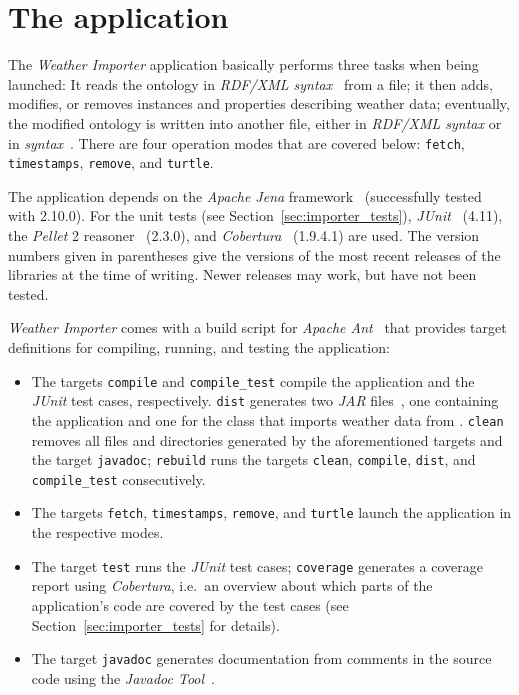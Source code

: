 \section{The application}
\label{sec:importer_application}

The \emph{Weather Importer} application basically performs three tasks when being launched: It reads the \smarthomeweather ontology in \emph{RDF/XML syntax}~\cite{RDF_XML} from a file; it then adds, modifies, or removes instances and properties describing weather data; eventually, the modified ontology is written into another file, either in \emph{RDF/XML syntax} or in \emph{ syntax}~\cite{Turtle}. There are four operation modes that are covered below: \texttt{fetch}, \texttt{timestamps}, \texttt{remove}, and \texttt{turtle}.

The application depends on the \emph{Apache Jena} framework~\cite{apache_jena} (successfully tested with 2.10.0). For the unit tests (see Section~\ref{sec:importer_tests}), \emph{JUnit}~\cite{junit} (4.11), the \emph{Pellet}  2 reasoner~\cite{pellet} (2.3.0), and \emph{Cobertura}~\cite{cobertura} (1.9.4.1) are used. The version numbers given in parentheses give the versions of the most recent releases of the libraries at the time of writing. Newer releases may work, but have not been tested.

\emph{Weather Importer} comes with a build script for \emph{Apache Ant}~\cite{apache_ant} that provides target definitions for compiling, running, and testing the application:

\begin{itemize}
  \item The targets \texttt{compile} and \texttt{compile\_test} compile the application and the \emph{JUnit} test cases, respectively. \texttt{dist} generates two \emph{JAR} files~\cite{jar}, one containing the application and one for the class that imports weather data from \yrno. \texttt{clean} removes all files and directories generated by the aforementioned targets and the target \texttt{javadoc}; \texttt{rebuild} runs the targets \texttt{clean}, \texttt{compile}, \texttt{dist}, and \texttt{compile\_test} consecutively.
  \item The targets \texttt{fetch}, \texttt{timestamps}, \texttt{remove}, and \texttt{turtle} launch the application in the respective modes.
  \item The target \texttt{test} runs the \emph{JUnit} test cases; \texttt{coverage} generates a coverage report using \emph{Cobertura}, i.e.\ an overview about which parts of the application's code are covered by the test cases (see Section~\ref{sec:importer_tests} for details).
  \item The target \texttt{javadoc} generates documentation from comments in the source code using the \emph{Javadoc Tool}~\cite{javadoc}.
\end{itemize}

